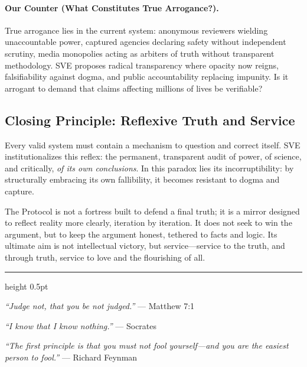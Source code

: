 \documentclass[11pt,a4paper]{article}
\begin{document}
\begin{small}
\paragraph{\textbf{Our Counter (What Constitutes True Arrogance?).}} True arrogance lies in the current system: anonymous reviewers wielding unaccountable power, captured agencies declaring safety without independent scrutiny, media monopolies acting as arbiters of truth without transparent methodology. SVE proposes radical transparency where opacity now reigns, falsifiability against dogma, and public accountability replacing impunity. Is it arrogant to demand that claims affecting millions of lives be verifiable?

\vspace{1.5em}

\subsection*{\textcolor{headercolor}{Closing Principle: Reflexive Truth and Service}}

Every valid system must contain a mechanism to question and correct itself. SVE institutionalizes this reflex: the permanent, transparent audit of power, of science, and critically, \textit{of its own conclusions}. In this paradox lies its incorruptibility: by structurally embracing its own fallibility, it becomes resistant to dogma and capture.

The Protocol is not a fortress built to defend a final truth; it is a mirror designed to reflect reality more clearly, iteration by iteration. It does not seek to win the argument, but to keep the argument honest, tethered to facts and logic. Its ultimate aim is not intellectual victory, but service—service to the truth, and through truth, service to love and the flourishing of all.

\vspace{2em}

\begin{center}
\begin{minipage}{0.9\textwidth}
\hrule height 0.5pt
\vspace{1em}

\noindent\textit{``Judge not, that you be not judged.''} --- Matthew 7:1

\vspace{0.6em}
\noindent\textit{``I know that I know nothing.''} --- Socrates

\vspace{0.6em}
\noindent\textit{``The first principle is that you must not fool yourself—and you are the easiest person to fool.''} --- Richard Feynman


\end{minipage}
\end{center}
\end{small}
\end{document}
